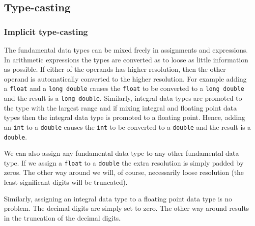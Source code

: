 
\subsection{Type-casting}

\subsubsection{Implicit type-casting}

The fundamental data types can be mixed freely in assignments and expressions.
In arithmetic  expressions the types are converted as to loose as little information
as possible. If either of the operands has higher resolution, then the other operand
is automatically converted to the higher resolution. For example adding a
\verb+float+ and a \verb+long double+ causes the \verb+float+ to be converted
to a \verb+long double+ and the result is a \verb+long double+. Similarly, integral
data types are promoted to the type with the largest range and if mixing integral
and floating point data types then the integral data type is promoted to a floating
point. Hence, adding an \verb+int+ to a \verb+double+ causes the \verb+int+ to be
converted to a \verb+double+ and the result is a \verb+double+.

We can also assign any fundamental data type to any other fundamental data type.
If we assign a \verb+float+ to a \verb+double+ the extra resolution is simply padded
by zeros. The other way around we will, of course, necessarily loose resolution (the
least significant digits will be truncated).

Similarly, assigning an integral data type to a floating point data type is no problem.
The decimal digits are simply set to zero. The other way around results in the
truncation of the decimal digits.


